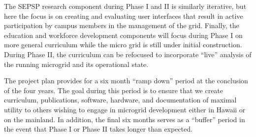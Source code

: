 The SEPSP research component during Phase I and II is similarly iterative,
but here the focus is on creating and evaluating user interfaces that
result in active participation by campus members in the management of the
grid.  Finally, the education and workforce development components will
focus during Phase I on more general curriculum while the micro grid is
still under initial construction.  During Phase II, the curriculum can be
refocused to incorporate ``live'' analysis of the running microgrid and its
operational state. 

The project plan provides for a six month ``ramp down'' period at the
conclusion of the four years.  The goal during this period is to ensure
that we  create curriculum, publications, software, hardware, and
documentation of maximal utility to others wishing to engage in microgrid
development either in Hawaii or on the mainland.   In addition, the final
six months serves as a ``buffer'' period in the event that Phase I or Phase
II takes longer than expected. 







